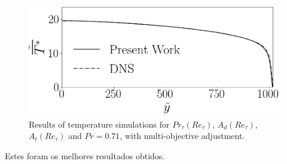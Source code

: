 \begin{figure}[!h]
\begin{minipage}[t]{0.5\textwidth}
	\end{minipage}
	\begin{minipage}[t]{0.45\textwidth}
		\centering
		\includegraphics[angle=0, scale=0.24]{fotos_formatacao_final/Temperature_1000_071_Genetic2temperature}
	\end{minipage}	
	\caption{Results of temperature simulations for $Pr_\tau(Re_\tau)$, $A_d(Re_\tau)$, $A_t(Re_\tau) $ and $Pr =0.71$, with multi-objective adjustment.}
\end{figure}

Estes foram os melhores resultados obtidos.
